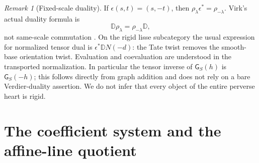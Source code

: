 \documentclass[11pt]{article}
\numberwithin{equation}{section}
\theoremstyle{definition}
\theoremstyle{remark}
\newtheorem{remark}[remark]{Remark}
\newcommand{\DD}{\mathbb D}
\begin{document}
\begin{remark}[Fixed-scale duality]\label{rem:duality}
If $\epsilon(s,t)=(s,-t)$, then
$\rho_\lambda\epsilon^*=\rho_{-\lambda}$. Virk's actual duality formula is
\[
  \DD\rho_\lambda=\rho_{-\lambda}\DD,
\]
not same-scale commutation \cite[Theorem~6.13]{Virk}. On the rigid lisse
subcategory the usual expression for normalized tensor dual is
$\epsilon^*\DD N(-d)$: the Tate twist removes the smooth-base orientation
twist. Evaluation and coevaluation are understood in the transported
normalization. In particular the tensor inverse of $\mathsf G_S(h)$ is
$\mathsf G_S(-h)$; this follows directly from graph addition and does not
rely on a bare Verdier-duality assertion. We do not infer that every
object of the entire perverse heart is rigid.
\end{remark}

\section{The coefficient system and the affine-line quotient}\label{sec:heart}
\end{document}
